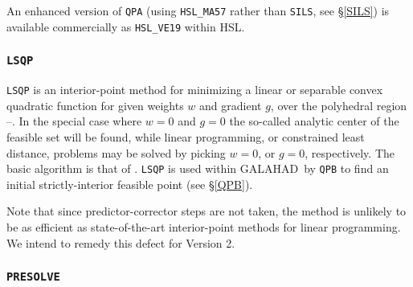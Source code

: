 \documentclass[twoside]{article}
\newcommand{\gal}{{\sf GALAHAD}}
\newcommand{\ltsubsubsection}[1]{\subsubsection{{\tt #1}} \label{#1}}
\begin{document}
An enhanced version of {\tt QPA} (using {\tt HSL\_MA57} rather than {\tt SILS},
see \S\ref{SILS}) is available commercially as {\tt HSL\_VE19} within HSL.

\ltsubsubsection{LSQP}

{\tt LSQP} is an interior-point method for minimizing a linear or 
separable convex quadratic function 
for given weights $w$ and gradient $g$, 
over the polyhedral region --.
In the special case where $w = 0$ and $g = 0$
the so-called analytic center of the feasible set will be found,
while linear programming, or constrained least distance, problems
may be solved by picking $w = 0$, or $g = 0$, respectively.
The basic algorithm is that of .
{\tt LSQP} is used within \gal\ by {\tt QPB} to find an initial
strictly-interior feasible point (see \S\ref{QPB}).

Note that since predictor-corrector steps are not taken, the method
is unlikely to be as efficient as state-of-the-art interior-point 
methods for linear programming. We intend to remedy this defect for
Version 2.

\ltsubsubsection{PRESOLVE}
\end{document}
